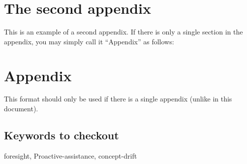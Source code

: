 \documentclass[10pt]{article} %
\begin{document}
\section{The second appendix}
\label{sec:appendix2}
This is an example of a second appendix. If there is only a single section in the appendix, you may simply call it ``Appendix'' as follows:

\section*{Appendix}
This format should only be used if there is a single appendix (unlike in this document).

\subsection{Keywords to checkout}
foresight, Proactive-assistance, concept-drift
\end{document}
